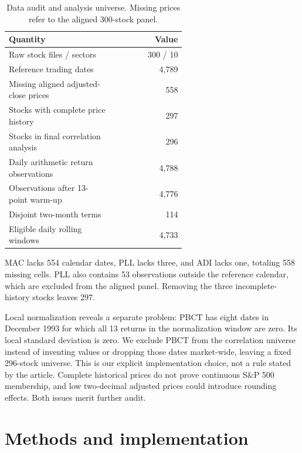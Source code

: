 \documentclass[11pt,a4paper]{article}
\begin{document}
\begin{table}[htbp]\centering
\caption{Data audit and analysis universe. Missing prices refer to the aligned 300-stock panel.}\label{tab:data}
\begin{tabular}{@{}p{0.60\linewidth}r@{}}\toprule
Quantity & Value \\ \midrule
Raw stock files / sectors & 300 / 10 \\
Reference trading dates & 4,789 \\
Missing aligned adjusted-close prices & 558 \\
Stocks with complete price history & 297 \\
Stocks in final correlation analysis & 296 \\
Daily arithmetic return observations & 4,788 \\
Observations after 13-point warm-up & 4,776 \\
Disjoint two-month terms & 114 \\
Eligible daily rolling windows & 4,733 \\
\bottomrule\end{tabular}\end{table}

MAC lacks 554 calendar dates, PLL lacks three, and ADI lacks one, totaling 558 missing cells. PLL also contains 53 observations outside the reference calendar, which are excluded from the aligned panel. Removing the three incomplete-history stocks leaves 297.

Local normalization reveals a separate problem: PBCT has eight dates in December 1993 for which all 13 returns in the normalization window are zero. Its local standard deviation is zero. We exclude PBCT from the correlation universe instead of inventing values or dropping those dates market-wide, leaving a fixed 296-stock universe. This is our explicit implementation choice, not a rule stated by the article. Complete historical prices do not prove continuous S\&P 500 membership, and low two-decimal adjusted prices could introduce rounding effects. Both issues merit further audit.

\section{Methods and implementation}
\end{document}
